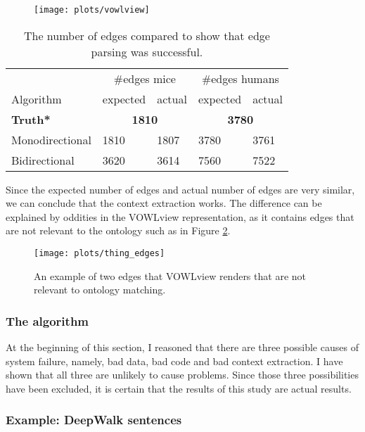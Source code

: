 \documentclass{article}
\begin{document}
  \begin{figure}[H]
  \centering
  \texttt{[image: plots/vowlview]}
  \caption[]{}
  \label{vowlfig}
  \end{figure}
  
  \begin{table}[H]
  \centering
  \caption[Edge comparison]{The number of edges compared to show that edge parsing was successful.}
  \label{edgecounts}
  \begin{tabular}{l|ll|ll}  
  & \multicolumn{2}{c}{\#edges mice} & \multicolumn{2}{c|}{\#edges humans}\\
  Algorithm & expected & actual & expected & actual\\
  \hline
  \textbf{Truth*} & \multicolumn{2}{c|}{\textbf{1810}} & \multicolumn{2}{c}{\textbf{3780}} \\
  Monodirectional & 1810 & 1807 & 3780 & 3761\\
  Bidirectional & 3620 & 3614 & 7560 & 7522\\
  \end{tabular}
  \end{table}

  Since the expected number of edges and actual number of edges are very similar, we can conclude that the context extraction works. The difference can be explained by oddities in the VOWLview representation, as it contains edges that are not relevant to the ontology such as in Figure \ref{thing_edges}.
  
  \begin{figure}
  \centering
  \texttt{[image: plots/thing\_edges]}
  \caption[Addition edges example]{An example of two edges that VOWLview renders that are not relevant to ontology matching.}
  \label{thing_edges}
  \end{figure}
  
  \subsubsection{The algorithm}
  At the beginning of this section, I reasoned that there are three possible causes of system failure, namely, bad data, bad code and bad context extraction. I have shown that all three are unlikely to cause problems. Since those three possibilities have been excluded, it is certain that the results of this study are actual results.
 
 \subsubsection{Example: DeepWalk sentences} \label{sentences}
 
\end{document}
